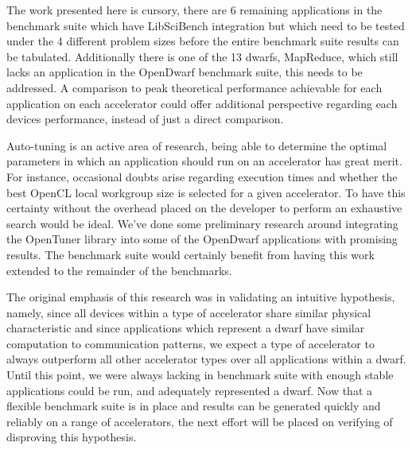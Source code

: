 \documentclass[../document.tex]{subfiles}
\begin{document}
\label{sec:future_work}

The work presented here is cursory, there are 6 remaining applications in the benchmark suite which have LibSciBench integration but which need to be tested under the 4 different problem sizes before the entire benchmark suite results can be tabulated.
Additionally there is one of the 13 dwarfs, MapReduce, which still lacks an application in the OpenDwarf benchmark suite, this needs to be addressed.
A comparison to peak theoretical performance achievable for each application on each accelerator could offer additional perspective regarding each devices performance, instead of just a direct comparison.

Auto-tuning is an active area of research, being able to determine the optimal parameters in which an application should run on an accelerator has great merit.
For instance, occasional doubts arise regarding execution times and whether the best OpenCL local workgroup size is selected for a given accelerator.
To have this certainty without the overhead placed on the developer to perform an exhaustive search would be ideal.
We've done some preliminary research around integrating the OpenTuner library into some of the OpenDwarf applications with promising results.
The benchmark suite would certainly benefit from having this work extended to the remainder of the benchmarks.

The original emphasis of this research was in validating an intuitive hypothesis, namely, since all devices within a type of accelerator share similar physical characteristic and since applications which represent a dwarf have similar computation to communication patterns, we expect a type of accelerator to always outperform all other accelerator types over all applications within a dwarf.
Until this point, we were always lacking in benchmark suite with enough stable applications could be run, and adequately represented a dwarf.
Now that a flexible benchmark suite is in place and results can be generated quickly and reliably on a range of accelerators, the next effort will be placed on verifying of disproving this hypothesis.
\end{document}
